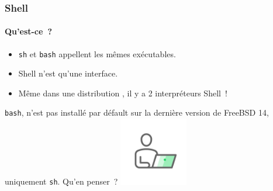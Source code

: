 \documentclass{beamer}
\begin{document}
    \begin{frame}
        \transdissolve
        \frametitle{Shell}
        \framesubtitle{Qu'est-ce~?}
        \begin{itemize}
            \item \lstinline{sh} et \lstinline{bash} appellent les mêmes exécutables.
            \item Shell n'est qu'une interface.
            \item Même dans une distribution , il y a 2 interpréteurs Shell~!
        \end{itemize}
        \bigbreak
        \lstinline{bash}, n'est pas installé par défault sur la dernière version de FreeBSD 14, uniquement \lstinline{sh}.
        Qu'en penser~?
        \bigbreak
        \centering
        \includegraphics[width=3cm]{image/guy-in-front-of-desktop}
    \end{frame}
\end{document}
